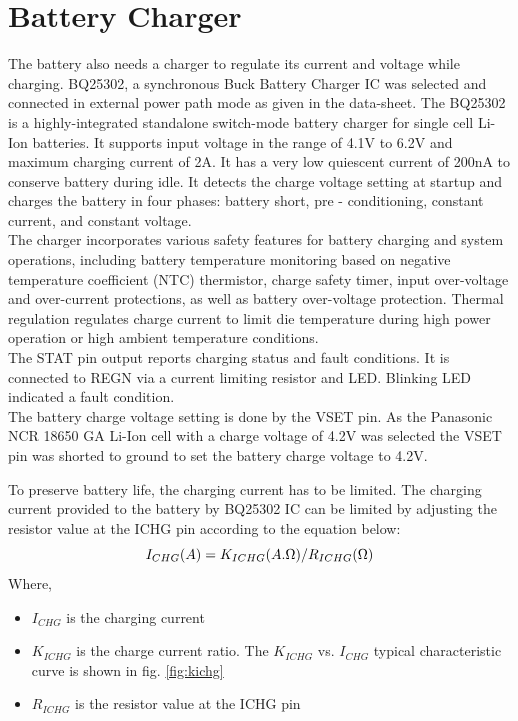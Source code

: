 \section[Battery Charger]{Battery Charger}
 The battery also needs a charger to regulate its current and voltage while charging.
 BQ25302, a synchronous Buck Battery Charger IC was selected and connected in external power path mode as given in the data-sheet. The BQ25302 is a highly-integrated standalone
 switch-mode battery charger for single cell Li-Ion batteries. It supports input voltage in the range of 4.1V to 6.2V and maximum charging current of 2A. It has a very low quiescent current of 200nA to conserve battery during idle.
 It detects the charge
 voltage setting at startup and charges the battery in four phases: battery short, pre - conditioning, constant
 current, and constant voltage. \\
 
 The charger incorporates various safety features for battery charging and system
 operations, including battery temperature monitoring based on negative temperature coefficient (NTC)
 thermistor, charge safety timer, input over-voltage and over-current protections, as well as battery over-voltage
 protection. Thermal regulation regulates charge current to limit die temperature during
 high power operation or high ambient temperature conditions.
 \\
 
 The STAT pin output reports charging status and fault conditions. It is connected to REGN via a current
 limiting resistor and LED. Blinking LED indicated a fault condition.\\
 
 The battery charge voltage setting is done by the VSET pin. As the Panasonic NCR 18650 GA Li-Ion cell with a charge voltage of 4.2V was selected the VSET pin was shorted to ground to set the battery charge voltage to 4.2V.
 
 
 To preserve battery life, the charging current has to be limited. The charging current provided to the battery by BQ25302 IC can be limited by adjusting the resistor value at the ICHG pin according to the equation below:
 \begin{equation}
 	I_{CHG} (A) = K_{ICHG} (A.\ohm) / R_{ICHG} (\ohm)
 	\label{eq:6.1}
 \end{equation}
 Where,
 \begin{itemize}
 	\item $I_{CHG}$ is the charging current
 	\item $K_{ICHG}$ is the charge current ratio.  The $K_{ICHG}$ vs.
 	$I_{CHG}$ typical characteristic curve is shown in fig. \ref{fig:kichg}
 	\item $R_{ICHG}$ is the resistor value at the ICHG pin 
 \end{itemize}
 
